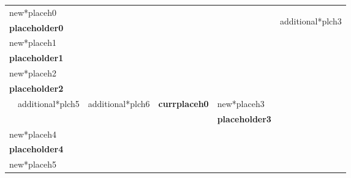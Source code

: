 \documentclass{article}
\begin{document}
\thispagestyle{empty}
\begin{table}[t]
{\setlength{\tabcolsep}{0.5em}
\begin{tabularx}{\textwidth}{|Xccll|c|}
\hline
\multicolumn{5}{|l|}{new*placeh0}                                                                                    & \multirow{22}{*}{ \begin{sideways}additional*plch3\end{sideways}} \\
\multicolumn{5}{|l|}{\textbf{placeholder0}}                                                                                                  &                                             \\
\multicolumn{5}{|l|}{new*placeh1}                                                                                &                                             \\
\multicolumn{5}{|l|}{\textbf{placeholder1}}                                                                                                  &                                             \\ \cline{1-5}
\multicolumn{5}{|l|}{new*placeh2}                                                                              &                                             \\
\multicolumn{5}{|l|}{\textbf{placeholder2}}                                                                                                  &                                             \\ \cline{2-3} \cline{5-5}
 & \multicolumn{1}{|l|}{additional*plch5}      & \multicolumn{1}{l|}{additional*plch6}      & \multicolumn{1}{X|}{\centering \textbf{currplaceh0}}      & new*placeh3                    &                                             \\ \cline{2-3}
&                             &                             & \multicolumn{1}{l|}{}                  &  \textbf{placeholder3}                &                                             \\ \cline{1-5}
\multicolumn{5}{|l|}{new*placeh4}                                                                         &                                             \\
\multicolumn{5}{|l|}{\textbf{placeholder4}}                                                                                                  &                                             \\
\multicolumn{5}{|l|}{new*placeh5}                                                                               &                                             \\

\end{tabularx}}
\end{table}
\end{document}
